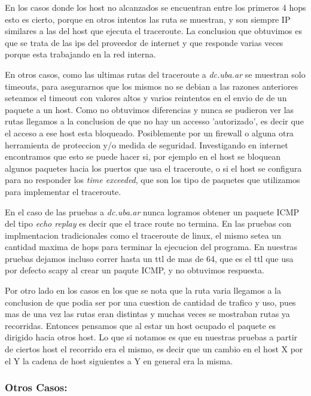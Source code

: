 \documentclass[a4paper]{article}
\begin{document}
 En los casos donde los host no alcanzados se encuentran entre los primeros 4 hops esto es cierto,
 porque en otros intentos las ruta se muestran, y son siempre IP similares a las del host que ejecuta el traceroute. La conclusion que obtuvimos es que se trata de las ips del proveedor de internet
 y que responde varias veces porque esta trabajando en la red interna.
  
 En otros casos, como las ultimas rutas del traceroute a \textit{dc.uba.ar} se muestran solo timeouts, para asegurarnos que los mismos no se debian a las razones anteriores seteamos el timeout con valores altos y varios reintentos en el envio de 
de un paquete a un host. Como no obtuvimos diferencias y nunca se pudieron ver las rutas llegamos a la conclusion de que no hay un accesso 'autorizado', es decir que el acceso a ese host esta 
 bloqueado. Posiblemente por un firewall o alguna otra herramienta de proteccion y/o medida  de seguridad. 
 Investigando en internet encontramos  que esto se puede hacer si, por ejemplo en el host se bloquean 
 algunos paquetes hacia los puertos que usa el traceroute, o si el host se configura para no responder
 los  \textit{time exceeded}, que son los tipo de paquetes que utilizamos para implementar el traceroute.
 
 En el caso de las pruebas a \textit{dc.uba.ar} nunca logramos obtener un paquete ICMP del tipo 
 \textit{echo replay}
 es decir que el trace route no termina. En las pruebas con implmentacion tradicionales como el traceroute 
 de linux, el mismo setea un cantidad maxima de hops para terminar la ejecucion del programa. En nuestras 
 pruebas dejamos incluso correr hasta un ttl de mas de 64, que es el ttl que usa por defecto scapy al crear 
 un paqute ICMP, y no obtuvimos respuesta.
 
 
 Por otro lado en los casos en los que se nota que la ruta varia llegamos a la conclusion de que podia ser por una cuestion
 de cantidad de trafico y uso, pues mas de una vez las rutas eran distintas y muchas veces se mostraban 
 rutas ya recorridas.
 Entonces pensamos que al estar un host ocupado el paquete es dirigido hacia otros host. Lo que si notamos es que en nuestras pruebas  a partir de ciertos host el recorrido era el mismo, es
 decir que un cambio en el host X  por el Y la  cadena de host siguientes a Y en general era la misma.
 
 
 \subsubsection{Otros Casos:}
 
\end{document}
